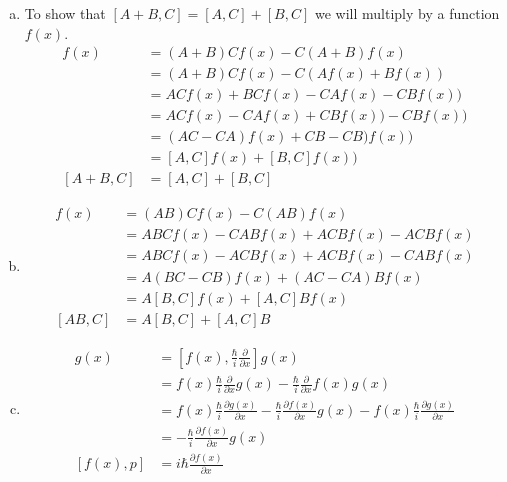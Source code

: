 \documentclass[11pt]{article}
\numberwithin{equation}{section}
\begin{document}
\begin{enumerate}[(a)]
\item
To show that $[A+B,C] = [A,C]+[B,C]$ we will multiply by a function $f(x)$.
\begin{align*}
[A+B,C]f(x) &= (A+B)Cf(x) - C(A+B)f(x)\\
&= (A+B)Cf(x) - C(Af(x)+Bf(x))\\
&= ACf(x)+BCf(x) - CAf(x) - CBf(x))\\
&= ACf(x)- CAf(x) + CBf(x)) - CBf(x))\\
&= (AC- CA)f(x) + CB - CB)f(x))\\
&= [A,C]f(x) + [B,C]f(x))\\
[A+B,C] &= [A,C] + [B,C]
\end{align*}

\item
\begin{align*}
[AB,C]f(x) &= (AB)Cf(x) - C(AB)f(x)\\
&= ABCf(x) - CABf(x) + ACBf(x) - ACBf(x)\\
&= ABCf(x) - ACBf(x) + ACBf(x)- CABf(x)  \\
&= A(BC - CB)f(x) + (AC- CA)Bf(x)  \\
&= A[B,C]f(x) + [A,C]Bf(x)  \\
[AB,C] &= A[B,C] + [A,C]B 
\end{align*}

\item
\begin{align*}
[f(x),p]g(x) &= \left[f(x), \frac{\hbar}{i}\frac{\partial}{\partial x}\right]g(x)\\
&= f(x)\frac{\hbar}{i}\frac{\partial}{\partial x}g(x) - \frac{\hbar}{i}\frac{\partial}{\partial x}f(x)g(x)\\
&= f(x)\frac{\hbar}{i}\frac{\partial g(x)}{\partial x} - \frac{\hbar}{i}\frac{\partial f(x)}{\partial x}g(x) - f(x)\frac{\hbar}{i}\frac{\partial g(x)}{\partial x}\\
&=  - \frac{\hbar}{i}\frac{\partial f(x)}{\partial x}g(x) \\
[f(x),p] &= i\hbar \frac{\partial f(x)}{\partial x} 
\end{align*}


\end{enumerate}
\end{document}
